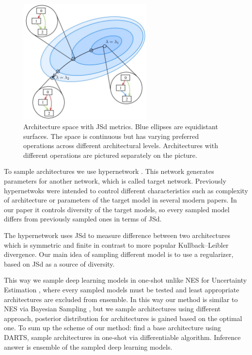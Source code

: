 \documentclass{article}
\begin{document}
\begin{figure}[h]
    \centering
    \includegraphics[width=0.6\textwidth]{fig1}
    \caption{\label{fig:arch}Architecture space with JSd metrics.
    Blue ellipses are equidistant surfaces. The space is continuous but has varying preferred operations across different architectural levels. Architectures with different operations are pictured separately on the picture.}
\end{figure}

To sample architectures we use hypernetwork \citep{hypernetworks}. This network generates parameters for another network, which is called target network.
Previously hypernetwoks were intended to control different characteristics such as
complexity of architecture \citep{darts-cc} or parameters of the target model \citep{cont-learn} in several modern papers. In our paper it controls 
diversity of the target models, so every sampled model differs from previously sampled ones in terms of JSd.

The hypernetwork uses JSd to measure difference between two architectures which is symmetric and finite
in contrast to more popular Kullback–Leibler divergence. Our main idea of sampling different model is to use a regularizer,
based on JSd as a source of diversity.

This way we sample deep learning models in one-shot unlike NES
for Uncertainty Estimation \citep{nes}, where every sampled models must be tested and least appropriate architectures are excluded from ensemble.
In this way our method is similar to NES via Bayesian Sampling \citep{baysiannes}, but we sample architectures using different approach, posterior distribution for architectures is gained based on the optimal one.
To sum up the scheme of our method: find a base architecture using DARTS, sample architectures in one-shot via differentiable algorithm. Inference answer is ensemble of the sampled deep learning models.
\end{document}
